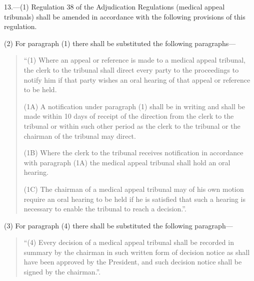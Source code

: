 \documentclass[a4paper]{article}
\begin{document}
13.—(1) Regulation 38 of the Adjudication Regulations (medical appeal tribunals) shall be amended in accordance with the following provisions of this regulation.

(2) For paragraph (1) there shall be substituted the following paragraphs—
\begin{quotation}
“(1) Where an appeal or reference is made to a medical appeal tribunal, the clerk to the tribunal shall direct every party to the proceedings to notify him if that party wishes an oral hearing of that appeal or reference to be held.

(1A) A notification under paragraph (1) shall be in writing and shall be made within 10 days of receipt of the direction from the clerk to the tribunal or within such other period as the clerk to the tribunal or the chairman of the tribunal may direct.

(1B) Where the clerk to the tribunal receives notification in accordance with paragraph (1A) the medical appeal tribunal shall hold an oral hearing.

(1C) The chairman of a medical appeal tribunal may of his own motion require an oral hearing to be held if he is satisfied that such a hearing is necessary to enable the tribunal to reach a decision.”.
\end{quotation}

(3) For paragraph (4) there shall be substituted the following paragraph—
\begin{quotation}
\begin{sloppypar}
“(4) Every decision of a medical appeal tribunal shall be recorded in summary by the chairman in such written form of decision notice as shall have been approved by the President, and such decision notice shall be signed by the chairman.”.
\end{sloppypar}
\end{quotation}
\end{document}
